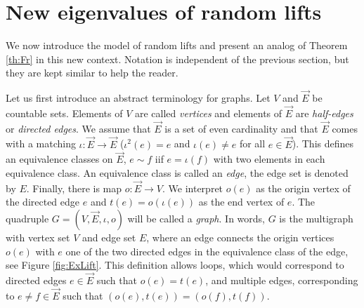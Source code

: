 \documentclass[11pt]{article}
\newcommand{\1}{1\!\!{\sf I}}\newcommand{\IND}{\1}
\begin{document}
\section{New eigenvalues of random lifts}

\label{sec:introbis}


We now introduce the model of random lifts and present an analog of  Theorem \ref{th:Fr} in this new context. Notation is independent of the previous section, but they are kept similar to help the reader.


Let us first introduce an abstract terminology for graphs. Let $V$ and $\vec E$ be countable sets. Elements of $V$ are called \emph{vertices} and elements of $\vec E$ are \emph{half-edges} or \emph{directed edges}. We assume that $\vec E$ is a set of even cardinality and that $\vec E$  comes with a matching  $\iota : \vec E \to \vec E$ ($\iota^2(e) = e$ and $\iota(e) \ne e$ for all $e \in \vec E$). This defines an equivalence classes on $\vec E$, $e \sim f$ iif $e = \iota(f)$ with two elements in each equivalence class. An equivalence class is called an \emph{edge}, the edge set is denoted by $E$. Finally, there is map $o : \vec E \to V$. We interpret $o (e)$ as the origin vertex of the  directed edge $e$ and $t(e) = o( \iota(e))$ as the end vertex of $e$. The quadruple $G  = (V,\vec E,\iota,o)$ will be called a \emph{graph}.  In words, $G$ is the multigraph with vertex set $V$ and edge set $E$, where an edge connects  the origin vertices $o(e)$ with $e$ one of the two directed edges in  the equivalence class of the edge, see Figure \ref{fig:ExLift}. This definition allows loops, which would correspond to directed edges $e \in \vec E$ such that $o(e) = t(e)$, and multiple edges, corresponding to $e \ne f \in \vec E$ such that $(o(e),t(e)) = (o(f),t(f))$. 
\end{document}
